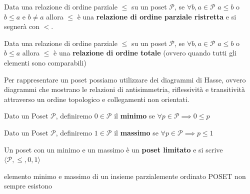 \begin{definizione}
    Data una relazione di ordine parziale $\le$ su un poset $\mathcal{P}$, se $\forall b,a\in \mathcal{P}$
    $a\le b$ o $b\le a$ e $b\ne a$ allora $\le$ è una \textbf{relazione di ordine parziale ristretta} e 
    si segnerà con $<$.
\end{definizione}

\begin{definizione}
    Data una relazione di ordine parziale $\le$ su un poset $\mathcal{P}$, se $\forall b,a\in \mathcal{P}$
    $a\le b$ o $b\le a$ allora $\le$ è una \textbf{relazione di ordine totale} (ovvero quando 
    tutti gli elementi sono comparabili)
\end{definizione}

Per rappresentare un poset possiamo utilizzare dei diagrammi di Hasse, ovvero diagrammi 
che mostrano le relazioni di antisimmetria, riflessività e transitività attraverso 
un ordine topologico e collegamenti non orientati.

\begin{definizione}
    Dato un Poset $\mathcal{P}$, definiremo $0\in \mathcal{P}$ il \textbf{minimo}
    se $\forall p \in \mathcal{P}\implies 0 \le p$ 
\end{definizione}
\begin{definizione}
    Dato un Poset $\mathcal{P}$, definiremo $1\in \mathcal{P}$ il \textbf{massimo}
    se $\forall p \in \mathcal{P}\implies p\le 1$ 
\end{definizione}

\begin{definizione}
    Un poset con un minimo e un massimo è un \textbf{poset limitato} e si scrive 
    $\langle \mathcal{P},\le , 0, 1\rangle$
\end{definizione}

\begin{nota}
    elemento minimo e massimo di un insieme parzialemente ordinato POSET non sempre 
    esistono
\end{nota}

